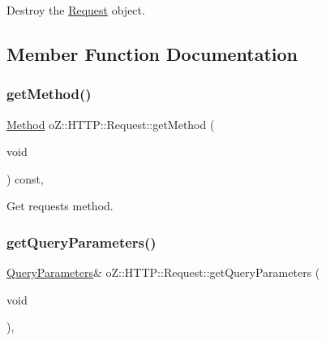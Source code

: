 Destroy the \mbox{\hyperlink{classo_z_1_1_h_t_t_p_1_1_request}{Request}} object. 



\subsection{Member Function Documentation}
\mbox{\label{classo_z_1_1_h_t_t_p_1_1_request_ab8c06f60e7d3b17c2ad03c7b9cb046d7}} 
\subsubsection{\texorpdfstring{getMethod()}{getMethod()}}
{\footnotesize\ttfamily \mbox{\hyperlink{namespaceo_z_1_1_h_t_t_p_a02d8497e4abbb0adf3af0fe9fad1b7a6}{Method}} o\+Z\+::\+H\+T\+T\+P\+::\+Request\+::get\+Method (\begin{DoxyParamCaption}\item[{void}]{ }\end{DoxyParamCaption}) const\hspace{0.3cm}{\ttfamily [inline]}, {\ttfamily [noexcept]}}



Get request\textquotesingle{}s method. 

\mbox{\label{classo_z_1_1_h_t_t_p_1_1_request_a6e710bce73719a47c0c8f59389a9b152}} 
\subsubsection{\texorpdfstring{getQueryParameters()}{getQueryParameters()}\hspace{0.1cm}{\footnotesize\ttfamily [1/2]}}
{\footnotesize\ttfamily \mbox{\hyperlink{namespaceo_z_1_1_h_t_t_p_adf31e2c29997ec6637f36d62ab8944d6}{Query\+Parameters}}\& o\+Z\+::\+H\+T\+T\+P\+::\+Request\+::get\+Query\+Parameters (\begin{DoxyParamCaption}\item[{void}]{ }\end{DoxyParamCaption})\hspace{0.3cm}{\ttfamily [inline]}, {\ttfamily [noexcept]}}



